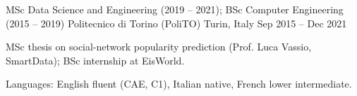
\begin{cventries}

  \joborrole
    {MSc Data Science and Engineering (2019 -- 2021); BSc Computer Engineering (2015 -- 2019)}
    {Politecnico di Torino (PoliTO)}
    {Turin, Italy}
    {Sep 2015 -- Dec 2021}
    {
      \item MSc thesis on social-network popularity prediction (Prof. Luca Vassio, SmartData); BSc internship at EisWorld.
      \item Languages: English fluent (CAE, C1), Italian native, French lower intermediate.
    }

\end{cventries}
